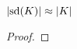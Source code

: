 \begin{ejercicio}\label{ej:56}
  $\left| \text{sd}(K) \right|\approx\left| K \right|$
\end{ejercicio}
\begin{proof}%

\end{proof}%

